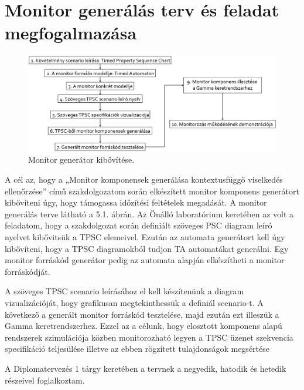 \chapter{Monitor generálás terv és feladat megfogalmazása}

\begin{figure}[!ht]
    \centering
    \includegraphics[width=150mm, keepaspectratio]{figures/generation_plan.png}
    \caption{Monitor generátor kibővítése.}
\end{figure}

A cél az, hogy a „Monitor komponensek generálása kontextusfüggő viselkedés ellenőrzése” című szakdolgozatom során elkészített monitor komponens generátort kibővíteni úgy, hogy támogassa időzítési feltételek megadását.
A monitor generálás terve látható a 5.1. ábrán.
Az Önálló laboratórium keretében az volt a feladatom, hogy a szakdolgozat során definiált szöveges PSC diagram leíró nyelvet kibővitsük a TPSC elemeivel.
Ezután az automata generátort kell úgy kibővíteni, hogy a TPSC diagramokból tudjon TA automatákat generálni.
Egy monitor forráskód generátor pedig az automata alapján elkészítheti a monitor forráskódját.

A szöveges TPSC scenario leírásához el kell készítenünk a diagram vizualizációját, hogy grafikusan megtekinthessük a definiál scenario-t.
A következő a generált monitor forráskód tesztelése, majd ezután ezt illeszük a Gamma keretrendszerhez.
Ezzel az a célunk, hogy elosztott komponens alapú rendszerek szimulációja közben monitorozható legyen a TPSC üzenet szekvencia specifikáció teljesülése illetve az ebben rögzített tulajdonságok megsértése

A Diplomatervezés 1 tárgy keretében a tervnek a negyedik, hatodik és hetedik részeivel foglalkoztam.